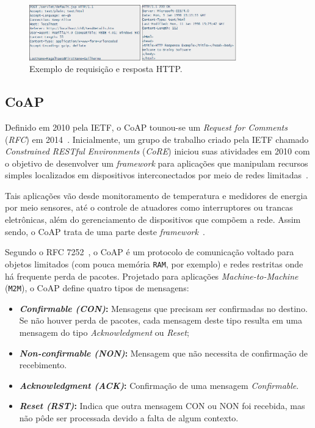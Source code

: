 \begin{figure}[ht]
	\centering
	\includegraphics[width=0.8\textwidth]{imagens/ex_http.png}
	\caption{Exemplo de requisição e resposta HTTP.
		\label{fig:http_ex}}
\end{figure}
\FloatBarrier 

\subsection{CoAP}\label{sec:coap}

Definido em 2010 pela IETF, o CoAP tounou-se um \textit{Request for Comments} (\textit{RFC}) em 2014~\cite{shelby2014constrained}. Inicialmente, um grupo de trabalho criado pela IETF chamado \textit{Constrained RESTful Environments} (\textit{CoRE}) iniciou suas atividades em 2010 com o objetivo de desenvolver um \textit{framework} para aplicações que manipulam recursos simples localizados em dispositivos interconectados por meio de redes limitadas~\cite{shelby2014constrained}. 

Tais aplicações vão desde monitoramento de temperatura e medidores de energia por meio sensores, até o controle de atuadores como interruptores ou trancas eletrônicas, além do gerenciamento de dispositivos que compõem a rede. Assim sendo, o CoAP trata de uma parte deste \textit{framework}~\cite{shelby2014constrained}.

Segundo o RFC 7252~\cite{shelby2014constrained}, o CoAP é um protocolo de comunicação voltado para objetos limitados (com pouca memória \texttt{RAM}, por exemplo) e redes restritas onde há frequente perda de pacotes. Projetado para aplicações \textit{Machine-to-Machine} (\texttt{M2M}), o CoAP define quatro tipos de mensagens:
\begin{itemize}
    \item \textbf{\textit{Confirmable (CON)}:} Mensagens que precisam ser confirmadas no destino. Se não houver perda de pacotes, cada mensagem deste tipo resulta em uma mensagem do tipo \textit{Acknowledgment} ou \textit{Reset};
    \item \textbf{\textit{Non-confirmable (NON)}:} Mensagem que não necessita de confirmação de recebimento.
    \item \textbf{\textit{Acknowledgment (ACK)}:} Confirmação de uma mensagem \textit{Confirmable}.
    \item \textbf{\textit{Reset (RST)}:} Indica que outra mensagem CON ou NON foi recebida, mas não pôde ser processada devido a falta de algum contexto.
\end{itemize}


